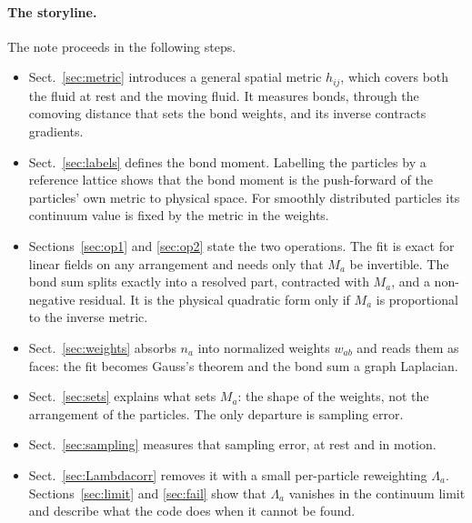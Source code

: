 \documentclass[11pt,aps,preprint,nofootinbib,superscriptaddress,tightenlines]{revtex4-2}
\def\Sect#1{Sect.~\ref{#1}}
\let\oldparagraph\paragraph
\renewcommand{\paragraph}{\par\medskip\oldparagraph}
\begin{document}
\paragraph{The storyline.}  The note proceeds in the following steps.
\begin{itemize}
\item \Sect{sec:metric} introduces a general spatial metric $h_{ij}$, which
  covers both the fluid at rest and the moving fluid.  It measures bonds, through
  the comoving distance that sets the bond weights, and its inverse contracts
  gradients.
\item \Sect{sec:labels} defines the bond moment.  Labelling the particles by a
  reference lattice shows that the bond moment is the push-forward of the
  particles' own metric to physical space.  For smoothly distributed particles
  its continuum value is fixed by the metric in the weights.
\item Sections~\ref{sec:op1} and \ref{sec:op2} state the two operations.  The
  fit is exact for linear fields on any arrangement and needs only that $M_a$ be
  invertible.  The bond sum splits exactly into a resolved part, contracted with
  $M_a$, and a non-negative residual.  It is the physical quadratic form only if
  $M_a$ is proportional to the inverse metric.
\item \Sect{sec:weights} absorbs $n_a$ into normalized weights $w_{ab}$ and
  reads them as faces: the fit becomes Gauss's theorem and the bond sum a graph
  Laplacian.
\item \Sect{sec:sets} explains what sets $M_a$: the shape of the weights, not
  the arrangement of the particles.  The only departure is sampling error.
\item \Sect{sec:sampling} measures that sampling error, at rest and in motion.
\item \Sect{sec:Lambdacorr} removes it with a small per-particle reweighting
  $\Lambda_a$.  Sections~\ref{sec:limit} and \ref{sec:fail} show that $\Lambda_a$
  vanishes in the continuum limit and describe what the code does when it
  cannot be found.
\end{itemize}
\end{document}
